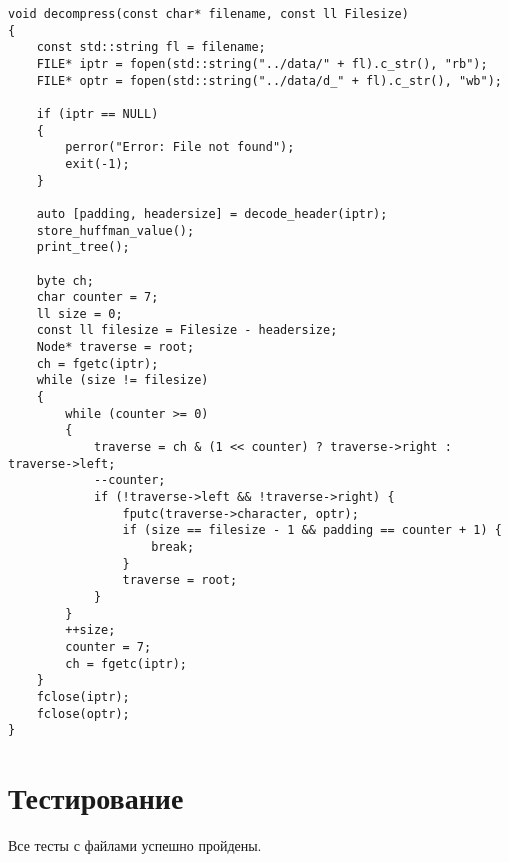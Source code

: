 \begin{lstlisting}[caption=Алгоритм разжатия файла]
void decompress(const char* filename, const ll Filesize)
{
	const std::string fl = filename;
	FILE* iptr = fopen(std::string("../data/" + fl).c_str(), "rb");
	FILE* optr = fopen(std::string("../data/d_" + fl).c_str(), "wb");
	
	if (iptr == NULL)
	{
		perror("Error: File not found");
		exit(-1);
	}
	
	auto [padding, headersize] = decode_header(iptr);
	store_huffman_value();
	print_tree();
	
	byte ch;
	char counter = 7;
	ll size = 0;
	const ll filesize = Filesize - headersize;
	Node* traverse = root;
	ch = fgetc(iptr);
	while (size != filesize)
	{
		while (counter >= 0)
		{
			traverse = ch & (1 << counter) ? traverse->right : traverse->left;
			--counter;
			if (!traverse->left && !traverse->right) {
				fputc(traverse->character, optr);
				if (size == filesize - 1 && padding == counter + 1) {
					break;
				}
				traverse = root;
			}
		}
		++size;
		counter = 7;
		ch = fgetc(iptr);
	}
	fclose(iptr);
	fclose(optr);
}
\end{lstlisting}

\section{Тестирование}
Все тесты с файлами успешно пройдены.
